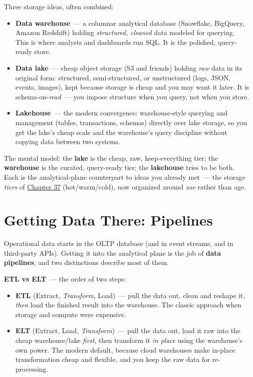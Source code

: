 Three storage ideas, often combined:

\begin{itemize}
\tightlist
\item
  \textbf{Data warehouse}~--- a columnar analytical database (Snowflake, BigQuery, Amazon Redshift) holding \emph{structured, cleaned} data modeled for querying. This is where analysts and dashboards run SQL. It is the polished, query-ready store.
\item
  \textbf{Data lake}~--- cheap object storage (S3 and friends) holding \emph{raw} data in its original form: structured, semi-structured, or unstructured (logs, JSON, events, images), kept because storage is cheap and you may want it later. It is schema-on-\emph{read}~--- you impose structure when you query, not when you store.
\item
  \textbf{Lakehouse}~--- the modern convergence: warehouse-style querying and management (tables, transactions, schemas) directly over lake storage, so you get the lake's cheap scale and the warehouse's query discipline without copying data between two systems.
\end{itemize}

\noindent{}The mental model: the \textbf{lake} is the cheap, raw, keep-everything tier; the \textbf{warehouse} is the curated, query-ready tier; the \textbf{lakehouse} tries to be both. Each is the analytical-plane counterpart to ideas you already met~--- the storage \emph{tiers} of \hyperref[ch:37-reliability]{Chapter 37} (hot/warm/cold), now organized around \emph{use} rather than age.

\setcounter{section}{2}
\section{Getting Data There: Pipelines}\label{42-data-analytics-plane:423-getting-data-there-pipelines}

Operational data starts in the OLTP database (and in event streams, and in third-party APIs). Getting it into the analytical plane is the job of \textbf{data pipelines}, and two distinctions describe most of them.

\textbf{ETL vs ELT}~--- the order of two steps:

\begin{itemize}
\tightlist
\item
  \textbf{ETL} (Extract, \emph{Transform}, Load)~--- pull the data out, clean and reshape it, \emph{then} load the finished result into the warehouse. The classic approach when storage and compute were expensive.
\item
  \textbf{ELT} (Extract, Load, \emph{Transform})~--- pull the data out, load it raw into the cheap warehouse/lake \emph{first}, then transform it \emph{in place} using the warehouse's own power. The modern default, because cloud warehouses make in-place transformation cheap and flexible, and you keep the raw data for re-processing.
\end{itemize}

